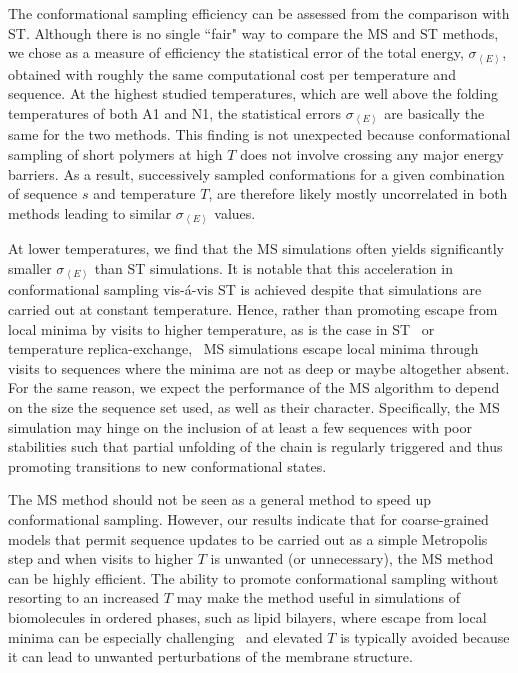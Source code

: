 \documentclass[
aip,
rsi,%
amsmath,amssymb,
reprint,%
]{revtex4-1}
\newcommand	 {\sbar}	{{s}}
\newcommand {\sigE}	{{\sigma_{\left < E \right >}}}
\begin{document}
The conformational sampling efficiency can be assessed from the comparison with ST. Although there is no single ``fair" way to compare the MS and ST methods, we chose as a measure of efficiency the statistical error of the total energy, $\sigE$, obtained with roughly the same computational cost per temperature and sequence. At the highest studied temperatures, which are well above the folding temperatures of both A1 and N1, the statistical errors $\sigE$ are basically the same for the two methods. This finding is not unexpected because conformational sampling of short polymers at high $T$ does not involve crossing any major energy barriers. As a result, successively sampled conformations for a given combination of sequence $\sbar$ and temperature $T$, are therefore likely mostly uncorrelated in both methods leading to similar $\sigE$ values. 

At lower temperatures, we find that the MS simulations often yields significantly smaller $\sigE$ than ST simulations. It is notable that this acceleration in conformational sampling vis-{\'a}-vis ST is achieved despite that simulations are carried out at constant temperature. Hence, rather than promoting escape from local minima by visits to higher temperature, as is the case in  ST~\cite{Marinari1992,Lyubartsev1992} or temperature replica-exchange,~\cite{Swendsen1986}  MS simulations escape local minima through visits to sequences where the minima are not as deep or maybe altogether absent. For the same reason, we expect the performance of the MS algorithm to depend on the size the sequence set used, as well as their character.  Specifically, the MS simulation may hinge on the inclusion of at least a few sequences with poor stabilities such that partial unfolding of the chain is regularly triggered and thus promoting transitions to new conformational states. 

The MS method should not be seen as a general method to speed up conformational sampling. However, our results indicate that for coarse-grained models that permit sequence updates to be carried out as a simple Metropolis step and when visits to higher $T$ is unwanted (or unnecessary), the MS method can be highly efficient. The ability to promote conformational sampling without resorting to an increased $T$ may make the method useful in simulations of biomolecules in ordered phases, such as lipid bilayers, where escape from local minima can be especially challenging~\cite{Bereau2015} and elevated $T$ is typically avoided because it can lead to unwanted perturbations of the membrane structure.~\cite{Ulmschneider2010}  
\end{document}
